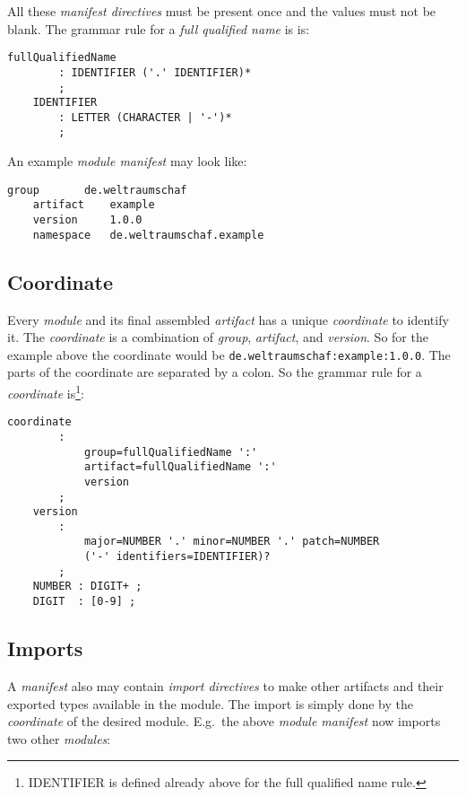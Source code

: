 \documentclass[11pt,a4paper]{report}
\begin{document}
All these \textit{manifest directives} must be present once and the values must not be blank. The grammar rule for a \textit{full qualified name} is is: 

\begin{lstlisting}[title=Grammar for full qualified name]
    fullQualifiedName 
        : IDENTIFIER ('.' IDENTIFIER)*
        ;
    IDENTIFIER 
        : LETTER (CHARACTER | '-')*
        ;
\end{lstlisting}

An example \textit{module manifest} may look like:

\begin{lstlisting}[language=CayThe, title=Module.mf]
    group       de.weltraumschaf
    artifact    example
    version     1.0.0
    namespace   de.weltraumschaf.example
\end{lstlisting}

\subsection{Coordinate}

Every \textit{module} and its final assembled \textit{artifact} has a unique \textit{coordinate} to identify it. The \textit{coordinate} is a combination of \textit{group}, \textit{artifact}, and \textit{version}. So for the example above the coordinate would be \texttt{de.weltraumschaf:example:1.0.0}. The parts of the coordinate are separated by a colon. So the grammar rule for a \textit{coordinate} is\footnote{IDENTIFIER is defined already above for the full qualified name rule.}:

\begin{lstlisting}[title=Grammar for coordinate]
    coordinate
        :
            group=fullQualifiedName ':'
            artifact=fullQualifiedName ':'
            version
        ;
    version
        : 
            major=NUMBER '.' minor=NUMBER '.' patch=NUMBER
            ('-' identifiers=IDENTIFIER)?
        ;
    NUMBER : DIGIT+ ;
    DIGIT  : [0-9] ;
\end{lstlisting}

\subsection{Imports}

A \textit{manifest} also may contain \textit{import directives} to make other artifacts and their exported types available in the module. The import is simply done by the \textit{coordinate} of the desired module. E.g.\ the above \textit{module manifest} now imports two other \textit{modules}:
\end{document}
